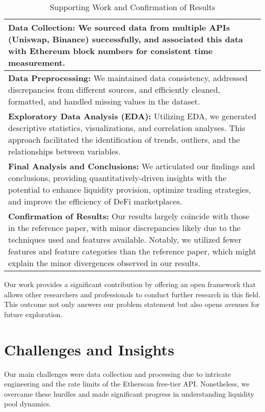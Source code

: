 \documentclass{article}
\begin{document}
  \begin{table}[htbp]
  \centering
  \small
  \begin{tabularx}{\linewidth}{|>{\raggedright\arraybackslash}X|}
  \hline
  \textbf{Data Collection:} We sourced data from multiple APIs (Uniswap, Binance) successfully, and associated this data with Ethereum block numbers for consistent time measurement. \\
  \hline
  \textbf{Data Preprocessing:} We maintained data consistency, addressed discrepancies from different sources, and efficiently cleaned, formatted, and handled missing values in the dataset. \\
  \hline
  \textbf{Exploratory Data Analysis (EDA):} Utilizing EDA, we generated descriptive statistics, visualizations, and correlation analyses. This approach facilitated the identification of trends, outliers, and the relationships between variables. \\
  \hline
  \textbf{Final Analysis and Conclusions:} We articulated our findings and conclusions, providing quantitatively-driven insights with the potential to enhance liquidity provision, optimize trading strategies, and improve the efficiency of DeFi marketplaces. \\
  \hline
  \textbf{Confirmation of Results:} Our results largely coincide with those in the reference paper, with minor discrepancies likely due to the techniques used and features available. Notably, we utilized fewer features and feature categories than the reference paper, which might explain the minor divergences observed in our results\cite{defi2023uniswap}. \\
  \hline
  \end{tabularx}
  \caption{Supporting Work and Confirmation of Results}
  \label{fig:approach-accomplishments}
  \end{table}


Our work provides a significant contribution by offering an open framework that allows other researchers and professionals to conduct further research in this field. This outcome not only answers our problem statement but also opens avenues for future exploration\cite{defi-characterisation-2023}.

\section*{\textbf{Challenges and Insights}}

Our main challenges were data collection and processing due to intricate engineering and the rate limits of the Etherscan free-tier API\cite{etherscan_api}. Nonetheless, we overcame these hurdles and made significant progress in understanding liquidity pool dynamics\cite{defi-characterisation-2023,impermanentloss2023,defi2023uniswap}.
\end{document}
